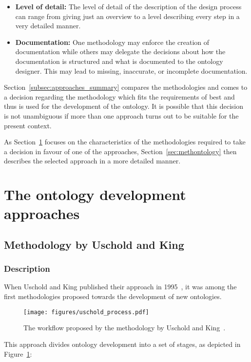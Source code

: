 \begin{itemize}
\begin{itemize}
      \item \textbf{Level of detail:} The level of detail of the description of the design process can range from giving just an overview to a level describing every step in a very detailed manner.

      \item \textbf{Documentation:} One methodology may enforce the creation of documentation while others may delegate the decisions about how the documentation is structured and what is documented to the ontology designer. This may lead to missing, inaccurate, or incomplete documentation.
    \end{itemize}
\end{itemize}

Section~\ref{subsec:approaches_summary} compares the methodologies and comes to a decision regarding the methodology which fits the requirements of \smarthomeweather best and thus is used for the development of the ontology. It is possible that this decision is not unambiguous if more than one approach turns out to be suitable for the present context.

As Section~\ref{sec:ontology_approaches} focuses on the characteristics of the methodologies required to take a decision in favour of one of the approaches, Section~\ref{sec:methontology} then describes the selected approach in a more detailed manner.

\section{The ontology development approaches}
\label{sec:ontology_approaches}

\subsection{Methodology by Uschold and King}
\label{subsec:approach3}

\subsubsection{Description}

When Uschold and King published their approach in 1995~\cite{UscholdKing}, it was among the first methodologies proposed towards the development of new ontologies.

\begin{figure}
\centering
\texttt{[image: figures/uschold\_process.pdf]}
\caption[The workflow proposed by Uschold and King]{The workflow proposed by the methodology by Uschold and King~\cite{UscholdKing}.}
\label{fig:uschold_process}
\end{figure}
This approach divides ontology development into a set of stages, as depicted in Figure~\ref{fig:uschold_process}:

